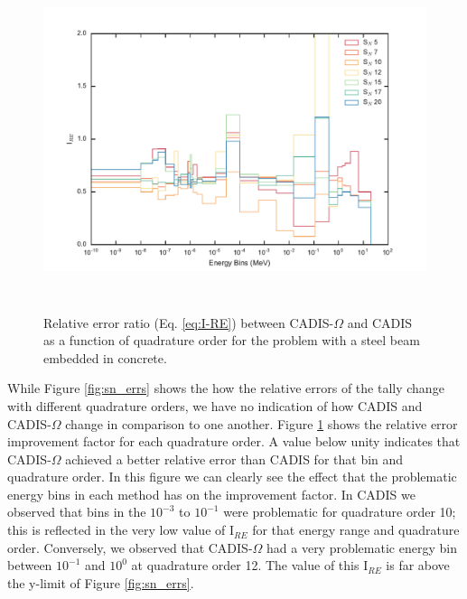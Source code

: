 \begin{figure}[h!]
  \centering
  \includegraphics[height=10cm]{./chapters/characterization_probs/figures/angle/prob_1/compare_err_quad.pdf}
  \caption[Relative error improvement factor (Eq. \eqref{eq:I-RE}) between CADIS-$\Omega$ and
  CADIS as a function of quadrature order for steel beam embedded in concrete.]
  {Relative error ratio (Eq. \eqref{eq:I-RE}) between CADIS-$\Omega$ and
   CADIS as a function of quadrature order for the problem with
   a steel beam embedded in concrete.}
  \label{fig:prob_1_quad_I_RE}
\end{figure}

While Figure \ref{fig:sn_errs} shows the how the relative errors of the tally
change with different quadrature orders, we have no indication of how CADIS and
CADIS-$\Omega$ change in comparison to one another. Figure
\ref{fig:prob_1_quad_I_RE} shows the relative error improvement factor for each
quadrature order. A value below unity indicates that CADIS-$\Omega$ achieved a
better relative error than CADIS for that bin and quadrature order. In this
figure we can clearly see the effect that the problematic energy bins in each
method has on the improvement factor. In CADIS we observed that bins in the
$10^{-3}$ to $10^{-1}$ were problematic for quadrature order 10; this is
reflected in the very low value of I$_{RE}$ for that energy range and quadrature
order. Conversely, we observed that CADIS-$\Omega$ had a very problematic energy
bin between $10^{-1}$ and $10^{0}$ at quadrature order 12. The value of this
I$_{RE}$ is far above the y-limit of Figure \ref{fig:sn_errs}.

